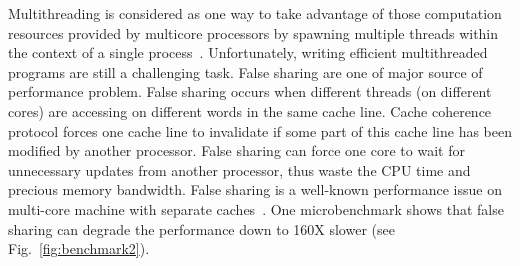 \label{sec:intro}
\begin{comment}
The false sharing problems can affect the performance greately, detection of false sharing is very important? \\
Definition of false sharing\\
How is state of art? Some approaches try to avoid that(compilation, scheduling, heap allocator), but none of them 
can avoid all false sharing problems successfully. \\
That is why we need the detection tool. What is the shortcomings of current detection tool, performance, false positives, far from the problems \\
What is the contribution of Sheriff? one runtime system to simulate multi-threaded program, low overhead, no false positives, precisely locate the root of problem\\
What is the target of Sheriff? How many types of false sharing Sheriff can detect? \\ 
What is the organization of this paper? \\
\end{comment}

Multithreading is considered as one way to take advantage of those 
computation resources provided by multicore processors by spawning multiple threads 
within the context of a single process~\cite{multithread}. 
Unfortunately, writing efficient multithreaded programs are still a challenging task. 
False sharing are one of major source of performance problem. 
False sharing occurs when different threads (on different cores) are accessing on
different words in the same cache line. 
Cache coherence protocol forces one cache line to invalidate if some part of this cache line
has been modified by another processor. False sharing can force one core to wait for 
unnecessary updates from another processor, thus waste the CPU time and precious memory bandwidth. 
False sharing is a well-known performance issue on multi-core machine with 
separate caches~\cite{falseshare:Analysis, falseshare:effect}. 
One microbenchmark shows that false sharing can degrade the performance 
down to 160X slower (see Fig.~\ref{fig:benchmark2}).

